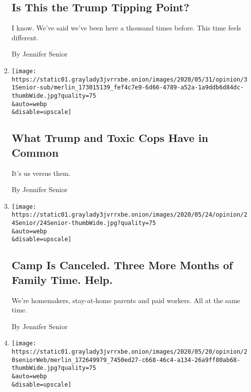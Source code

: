 \begin{enumerate}
  \hypertarget{is-this-the-trump-tipping-point}{%
  \subsection{Is This the Trump Tipping
  Point?}\label{is-this-the-trump-tipping-point}}

  I know. We've said we've been here a thousand times before. This time
  feels different.

  By Jennifer Senior
\item
  \href{/2020/05/31/opinion/trump-police-george-floyd.html}{}

  \texttt{[image: https://static01.graylady3jvrrxbe.onion/images/2020/05/31/opinion/31Senior-sub/merlin\_173015139\_fef4c7e9-6d66-4789-a52a-1a9ddb6d84dc-thumbWide.jpg?quality=75\\\&auto=webp\\\&disable=upscale]}

  \hypertarget{what-trump-and-toxic-cops-have-in-common}{%
  \subsection{What Trump and Toxic Cops Have in
  Common}\label{what-trump-and-toxic-cops-have-in-common}}

  It's us versus them.

  By Jennifer Senior
\item
  \href{/2020/05/24/opinion/coronavirus-parents-work-from-home.html}{}

  \texttt{[image: https://static01.graylady3jvrrxbe.onion/images/2020/05/24/opinion/24Senior/24Senior-thumbWide.jpg?quality=75\\\&auto=webp\\\&disable=upscale]}

  \hypertarget{camp-is-canceled-three-more-months-of-family-time-help}{%
  \subsection{Camp Is Canceled. Three More Months of Family Time.
  Help.}\label{camp-is-canceled-three-more-months-of-family-time-help}}

  We're homemakers, stay-at-home parents and paid workers. All at the
  same time.

  By Jennifer Senior
\item
  \href{/2020/05/20/opinion/trump-hydroxychloroquine-vaccine.html}{}

  \texttt{[image: https://static01.graylady3jvrrxbe.onion/images/2020/05/20/opinion/20seniorWeb/merlin\_172649979\_7450ed27-c668-46c4-a134-26a9ff80ab68-thumbWide.jpg?quality=75\\\&auto=webp\\\&disable=upscale]}


\end{enumerate}

